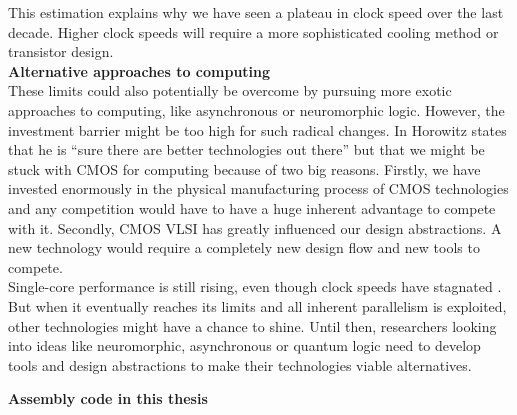 \documentclass[12pt,a4paper]{article} %
\begin{document}
This estimation explains why we have seen a plateau in clock speed over the last decade. Higher clock speeds will require a more sophisticated cooling method or transistor design.\\


\textbf{Alternative approaches to computing}\\
These limits could also potentially be overcome by pursuing more exotic approaches to computing, like asynchronous or neuromorphic logic. However, the investment barrier might be too high for such radical changes. In \cite{ComputingsEnergyProblem} Horowitz states that he is ``sure there are better technologies out there'' but that we might be stuck with CMOS for computing because of two big reasons. Firstly, we have invested enormously in the physical manufacturing process of CMOS technologies and any competition would have to have a huge inherent advantage to compete with it. Secondly, CMOS VLSI has greatly influenced our design abstractions. A new technology would require a completely new design flow and new tools to compete. \\
Single-core performance is still rising, even though clock speeds have stagnated \cite{recordingCPUHistory}. But when it eventually reaches its limits and all inherent parallelism is exploited, other technologies might have a chance to shine. Until then, researchers looking into ideas like neuromorphic, asynchronous or quantum logic need to develop tools and design abstractions to make their technologies viable alternatives.


\newpage

\cleardoublepage

{}
\label{sec-assembly}
\textbf{\Large Assembly code in this thesis}\\
 
\end{document}
